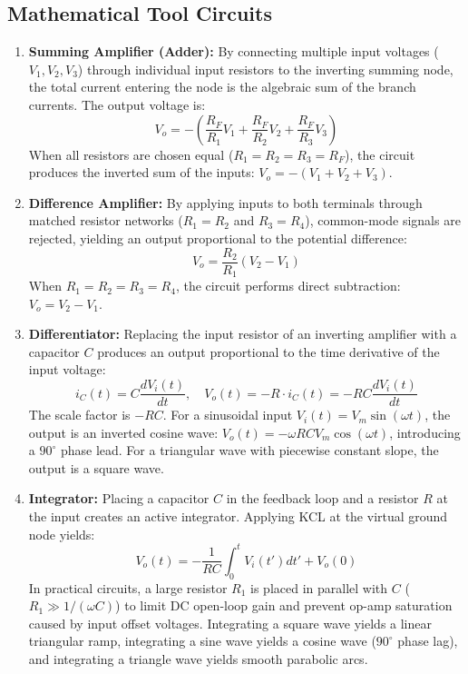 \documentclass[12pt,a4paper]{article}
\begin{document}
\subsection{Mathematical Tool Circuits}
\begin{enumerate}
    \item \textbf{Summing Amplifier (Adder):}
    By connecting multiple input voltages ($V_1, V_2, V_3$) through individual input resistors to the inverting summing node, the total current entering the node is the algebraic sum of the branch currents. The output voltage is:
    \begin{equation}
        V_o = -\left( \frac{R_F}{R_1} V_1 + \frac{R_F}{R_2} V_2 + \frac{R_F}{R_3} V_3 \right)
    \end{equation}
    When all resistors are chosen equal ($R_1 = R_2 = R_3 = R_F$), the circuit produces the inverted sum of the inputs: $V_o = -(V_1 + V_2 + V_3)$.
    
    \item \textbf{Difference Amplifier:}
    By applying inputs to both terminals through matched resistor networks ($R_1 = R_2$ and $R_3 = R_4$), common-mode signals are rejected, yielding an output proportional to the potential difference:
    \begin{equation}
        V_o = \frac{R_2}{R_1} (V_2 - V_1)
    \end{equation}
    When $R_1 = R_2 = R_3 = R_4$, the circuit performs direct subtraction: $V_o = V_2 - V_1$.
    
    \item \textbf{Differentiator:}
    Replacing the input resistor of an inverting amplifier with a capacitor $C$ produces an output proportional to the time derivative of the input voltage:
    \begin{equation}
        i_C(t) = C \frac{dV_i(t)}{dt}, \quad V_o(t) = -R \cdot i_C(t) = -RC \frac{dV_i(t)}{dt}
    \end{equation}
    The scale factor is $-RC$. For a sinusoidal input $V_i(t) = V_m \sin(\omega t)$, the output is an inverted cosine wave: $V_o(t) = -\omega RC V_m \cos(\omega t)$, introducing a $90^\circ$ phase lead. For a triangular wave with piecewise constant slope, the output is a square wave.
    
    \item \textbf{Integrator:}
    Placing a capacitor $C$ in the feedback loop and a resistor $R$ at the input creates an active integrator. Applying KCL at the virtual ground node yields:
    \begin{equation}
        V_o(t) = -\frac{1}{RC} \int_0^t V_i(t') dt' + V_o(0)
    \end{equation}
    In practical circuits, a large resistor $R_1$ is placed in parallel with $C$ ($R_1 \gg 1/(\omega C)$) to limit DC open-loop gain and prevent op-amp saturation caused by input offset voltages. Integrating a square wave yields a linear triangular ramp, integrating a sine wave yields a cosine wave ($90^\circ$ phase lag), and integrating a triangle wave yields smooth parabolic arcs.
\end{enumerate}
\end{document}
